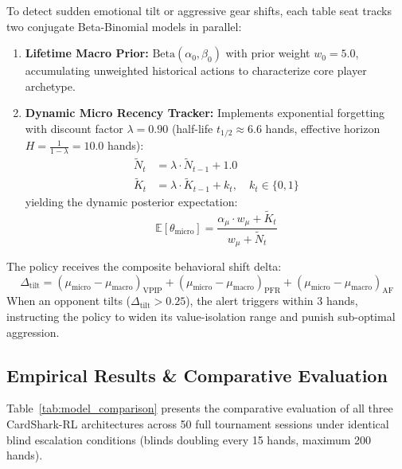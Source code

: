 To detect sudden emotional tilt or aggressive gear shifts, each table seat tracks two conjugate Beta-Binomial models in parallel:
\begin{enumerate}
    \item \textbf{Lifetime Macro Prior:} $\text{Beta}(\alpha_0, \beta_0)$ with prior weight $w_0 = 5.0$, accumulating unweighted historical actions to characterize core player archetype.
    \item \textbf{Dynamic Micro Recency Tracker:} Implements exponential forgetting with discount factor $\lambda = 0.90$ (half-life $t_{1/2} \approx 6.6$ hands, effective horizon $H = \frac{1}{1-\lambda} = 10.0$ hands):
    \begin{align}
        \tilde{N}_t &= \lambda \cdot \tilde{N}_{t-1} + 1.0 \\
        \tilde{K}_t &= \lambda \cdot \tilde{K}_{t-1} + k_t, \quad k_t \in \{0, 1\}
    \end{align}
    yielding the dynamic posterior expectation:
    \begin{equation}
        \mathbb{E}[\theta_{\text{micro}}] = \frac{\alpha_{\mu} \cdot w_{\mu} + \tilde{K}_t}{w_{\mu} + \tilde{N}_t}
    \end{equation}
\end{enumerate}
The policy receives the composite behavioral shift delta:
\begin{equation}
    \Delta_{\text{tilt}} = (\mu_{\text{micro}} - \mu_{\text{macro}})_{\text{VPIP}} + (\mu_{\text{micro}} - \mu_{\text{macro}})_{\text{PFR}} + (\mu_{\text{micro}} - \mu_{\text{macro}})_{\text{AF}}
\end{equation}
When an opponent tilts ($\Delta_{\text{tilt}} > 0.25$), the alert triggers within 3 hands, instructing the policy to widen its value-isolation range and punish sub-optimal aggression.

\subsection{Empirical Results & Comparative Evaluation}
\label{subsec:model_c_results}

Table~\ref{tab:model_comparison} presents the comparative evaluation of all three CardShark-RL architectures across 50 full tournament sessions under identical blind escalation conditions (blinds doubling every 15 hands, maximum 200 hands).


